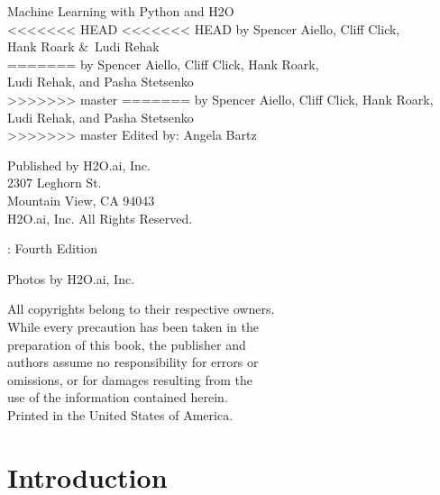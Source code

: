 \newpage
\restoregeometry

\null\vfill %

\thispagestyle{empty}%

{\raggedright 

Machine Learning with Python and H2O\\
<<<<<<< HEAD
<<<<<<< HEAD
  by Spencer Aiello, Cliff Click, \\ Hank Roark \&\  Ludi Rehak\\
=======
  by Spencer Aiello, Cliff Click, Hank Roark, \\ Ludi Rehak, and Pasha Stetsenko \\
>>>>>>> master
=======
  by Spencer Aiello, Cliff Click, Hank Roark, \\ Ludi Rehak, and Pasha Stetsenko \\
>>>>>>> master
Edited by: Angela Bartz
\bigskip

Published by H2O.ai, Inc. \\
2307 Leghorn St. \\
Mountain View, CA 94043\\
\bigskip
\textcopyright \the\year \hspace{1pt} H2O.ai, Inc. All Rights Reserved. 
\bigskip

\monthname \hspace{1pt}  \the\year: Fourth Edition
\bigskip

Photos by \textcopyright H2O.ai, Inc.
\bigskip

All copyrights belong to their respective owners.\\
While every precaution has been taken in the\\
preparation of this book, the publisher and\\
authors assume no responsibility for errors or\\
omissions, or for damages resulting from the\\
use of the information contained herein.\\
\bigskip
Printed in the United States of America. 
}


\newpage
\thispagestyle{empty}%

\tableofcontents
\thispagestyle{empty}%

\newpage

\section{Introduction}

